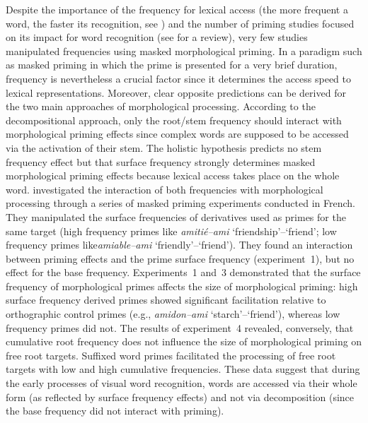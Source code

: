 \documentclass[output=paper]{langsci/langscibook}
\begin{document}
Despite the importance of the frequency for lexical access (the more 
 frequent a word, the faster its recognition, see 
\citealt{SolomonPostman1952}%
%
%
) and the number of priming studies focused on its impact for word
recognition (see %
\citealt{Kinoshita2006} %
%
%
 for a review), very few studies 
manipulated frequencies using masked morphological priming. In a
paradigm such as masked priming in which the prime is presented for a
very brief duration, frequency is nevertheless a crucial factor since it
determines the access speed to lexical representations. Moreover, clear
opposite predictions can be derived for the two main approaches of
morphological processing. According to the decompositional approach,
only the root/stem frequency should interact with morphological priming
effects since complex words are supposed to be accessed via the
activation of their stem. The holistic hypothesis predicts no stem
frequency effect but that surface frequency strongly determines masked
morphological priming effects because lexical access takes place on the
whole word. %
\citet{GiraudoGrainger2000} %
%
investigated the interaction of
both frequencies with morphological processing through a series of
masked priming experiments conducted in French. They manipulated the
surface frequencies of derivatives used as primes for the same target
(high frequency primes like \emph{amitié--ami} `friendship'--`friend';
low frequency primes like\emph{amiable--ami} `friendly'--`friend'). They found an interaction between priming effects and
the prime surface frequency (experiment~1), but no effect for the base
frequency. Experiments~1 and~3 demonstrated that the surface frequency
of morphological primes affects the size of morphological priming: high
surface frequency derived primes showed significant facilitation
relative to orthographic control primes (e.g., \emph{amidon--ami}
`starch'--`friend'), whereas low frequency primes did not. The results
of experiment~4 revealed, conversely, that cumulative root
frequency does not influence the size of morphological priming on free
root targets. Suffixed word primes facilitated the processing of free
root targets with low and high cumulative frequencies. These data
suggest that during the early processes of visual word recognition,
words are accessed via their whole form (as reflected by surface
frequency effects) and not via decomposition (since the base frequency
did not interact with priming).
\end{document}

